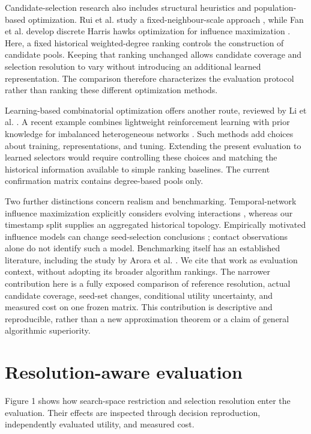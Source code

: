 \documentclass[smallextended]{svjour3}
\begin{document}
Candidate-selection research also includes structural heuristics and population-based optimization. Rui et al. study a fixed-neighbour-scale approach \cite{ref12}, while Fan et al. develop discrete Harris hawks optimization for influence maximization \cite{ref13}. Here, a fixed historical weighted-degree ranking controls the construction of candidate pools. Keeping that ranking unchanged allows candidate coverage and selection resolution to vary without introducing an additional learned representation. The comparison therefore characterizes the evaluation protocol rather than ranking these different optimization methods.

Learning-based combinatorial optimization offers another route, reviewed by Li et al. \cite{ref10}. A recent example combines lightweight reinforcement learning with prior knowledge for imbalanced heterogeneous networks \cite{ref14}. Such methods add choices about training, representations, and tuning. Extending the present evaluation to learned selectors would require controlling these choices and matching the historical information available to simple ranking baselines. The current confirmation matrix contains degree-based pools only.

Two further distinctions concern realism and benchmarking. Temporal-network influence maximization explicitly considers evolving interactions \cite{ref11}, whereas our timestamp split supplies an aggregated historical topology. Empirically motivated influence models can change seed-selection conclusions \cite{ref15}; contact observations alone do not identify such a model. Benchmarking itself has an established literature, including the study by Arora et al. \cite{ref16}. We cite that work as evaluation context, without adopting its broader algorithm rankings. The narrower contribution here is a fully exposed comparison of reference resolution, actual candidate coverage, seed-set changes, conditional utility uncertainty, and measured cost on one frozen matrix. This contribution is descriptive and reproducible, rather than a new approximation theorem or a claim of general algorithmic superiority.

\FloatBarrier


\section{Resolution-aware evaluation}

Figure 1 shows how search-space restriction and selection resolution enter the evaluation. Their effects are inspected through decision reproduction, independently evaluated utility, and measured cost.
\end{document}
